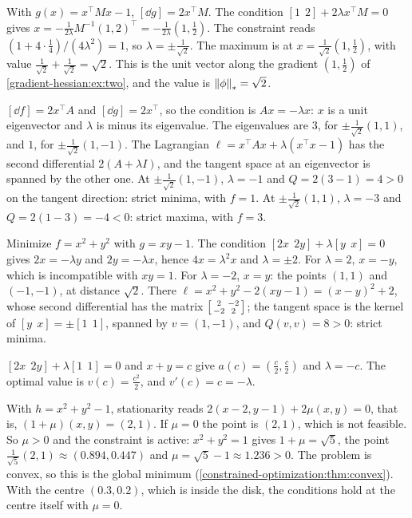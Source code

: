 With $g(x) = x^\top Mx - 1$, $[\dd g] = 2x^\top M$. The condition
$[1\ \ 2] + 2\lambda x^\top M = 0$ gives
$x = -\frac1{2\lambda}M^{-1}(1, 2)^\top = -\frac1{2\lambda}(1, \frac12)$.
The constraint reads $(1 + 4\cdot\frac14)/(4\lambda^2) = 1$, so
$\lambda = \pm\frac1{\sqrt2}$. The maximum is at
$x = \frac1{\sqrt2}(1, \frac12)$, with value
$\frac1{\sqrt2} + \frac1{\sqrt2} = \sqrt2$. This is the unit vector along
the gradient $(1, \frac12)$ of \cref{gradient-hessian:ex:two}, and the
value is $\left\|\phi\right\|_* = \sqrt2$.

$[\dd f] = 2x^\top A$ and $[\dd g] = 2x^\top$, so the condition is
$Ax = -\lambda x$: $x$ is a unit eigenvector and $\lambda$ is minus its
eigenvalue. The eigenvalues are $3$, for $\pm\frac1{\sqrt2}(1, 1)$, and
$1$, for $\pm\frac1{\sqrt2}(1, -1)$. The Lagrangian
$\ell = x^\top Ax + \lambda(x^\top x - 1)$ has the second differential
$2(A + \lambda I)$, and the tangent space at an eigenvector is spanned by
the other one. At $\pm\frac1{\sqrt2}(1, -1)$, $\lambda = -1$ and
$Q = 2(3 - 1) = 4 > 0$ on the tangent direction: strict minima, with
$f = 1$. At $\pm\frac1{\sqrt2}(1, 1)$, $\lambda = -3$ and
$Q = 2(1 - 3) = -4 < 0$: strict maxima, with $f = 3$.

Minimize $f = x^2 + y^2$ with $g = xy - 1$. The condition
$[2x\ \ 2y] + \lambda[y\ \ x] = 0$ gives $2x = -\lambda y$ and
$2y = -\lambda x$, hence $4x = \lambda^2x$ and $\lambda = \pm2$. For
$\lambda = 2$, $x = -y$, which is incompatible with $xy = 1$. For
$\lambda = -2$, $x = y$: the points $(1, 1)$ and $(-1, -1)$, at distance
$\sqrt2$. There $\ell = x^2 + y^2 - 2(xy - 1) = (x - y)^2 + 2$, whose
second differential has the matrix
$\begin{bsmallmatrix}2 & -2\\-2 & 2\end{bsmallmatrix}$; the tangent space
is the kernel of $[y\ \ x] = \pm[1\ \ 1]$, spanned by $v = (1, -1)$, and
$Q(v, v) = 8 > 0$: strict minima.

$[2x\ \ 2y] + \lambda[1\ \ 1] = 0$ and $x + y = c$ give
$a(c) = (\frac c2, \frac c2)$ and $\lambda = -c$. The optimal value is
$v(c) = \frac{c^2}2$, and $v'(c) = c = -\lambda$.

With $h = x^2 + y^2 - 1$, stationarity reads
$2(x - 2, y - 1) + 2\mu(x, y) = 0$, that is,
$(1 + \mu)(x, y) = (2, 1)$. If $\mu = 0$ the point is $(2, 1)$, which is
not feasible. So $\mu > 0$ and the constraint is active:
$x^2 + y^2 = 1$ gives $1 + \mu = \sqrt5$, the point
$\frac1{\sqrt5}(2, 1)\approx(0.894, 0.447)$ and
$\mu = \sqrt5 - 1\approx1.236 > 0$. The problem is convex, so this is the
global minimum (\cref{constrained-optimization:thm:convex}). With the
centre $(0.3, 0.2)$, which is inside the disk, the conditions hold at the
centre itself with $\mu = 0$.

